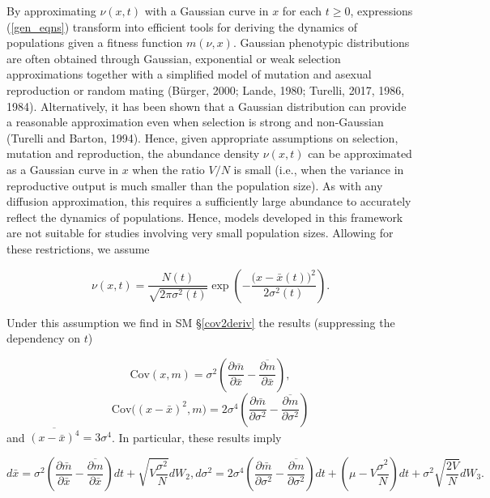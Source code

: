 \documentclass[]{elsarticle} %
\begin{document}
By approximating \(\nu(x,t)\) with a Gaussian curve in \(x\) for each
\(t\geq0\), expressions (\ref{gen_eqns}) transform into efficient tools
for deriving the dynamics of populations given a fitness function
\(m(\nu,x)\). Gaussian phenotypic distributions are often obtained
through Gaussian, exponential or weak selection approximations together
with a simplified model of mutation and asexual reproduction or random
mating (Bürger, 2000; Lande, 1980; Turelli, 2017, 1986, 1984).
Alternatively, it has been shown that a Gaussian distribution can
provide a reasonable approximation even when selection is strong and
non-Gaussian (Turelli and Barton, 1994). Hence, given appropriate
assumptions on selection, mutation and reproduction, the abundance
density \(\nu(x,t)\) can be approximated as a Gaussian curve in \(x\)
when the ratio \(V/N\) is small (i.e., when the variance in reproductive
output is much smaller than the population size). As with any diffusion
approximation, this requires a sufficiently large abundance to
accurately reflect the dynamics of populations. Hence, models developed
in this framework are not suitable for studies involving very small
population sizes. Allowing for these restrictions, we assume

\begin{equation}
\nu(x,t)=\frac{N(t)}{\sqrt{2\pi\sigma^2(t)}}\exp\left(-\frac{\big(x-\bar x(t)\big)^2}{2\sigma^2(t)}\right).
\end{equation}

Under this assumption we find in SM \S\ref{cov2deriv} the results
(suppressing the dependency on \(t\))

\begin{equation}\label{covxm}
\mathrm{Cov}(x,m)=\sigma^2\left(\frac{\partial\bar m}{\partial\bar x}-\overline{\frac{\partial m}{\partial\bar x}}\right),
\end{equation} \begin{equation}
\mathrm{Cov}\Big((x-\bar x)^2,m\Big)=2\sigma^4\left(\frac{\partial\bar m}{\partial\sigma^2}-\overline{\frac{\partial m}{\partial\sigma^2}}\right)
\end{equation} and \(\overline{(x-\bar x)^4}=3\sigma^4\). In particular,
these results imply

\begin{subequations}\label{no_inher}
\begin{equation}\label{xbar}
d\bar x=\sigma^2\left(\frac{\partial\bar m}{\partial\bar x}-\overline{\frac{\partial m}{\partial\bar x}}\right)dt+\sqrt{V\frac{\sigma^2}{N}}dW_2,
\end{equation}
\begin{equation}\label{G}
d\sigma^2=2\sigma^4\left(\frac{\partial\bar m}{\partial\sigma^2}-\overline{\frac{\partial m}{\partial\sigma^2}}\right)dt +\left(\mu-V\frac{\sigma^2}{N}\right)dt+\sigma^2\sqrt{\frac{2V}{N}}dW_3.
\end{equation}
\end{subequations}
\end{document}
